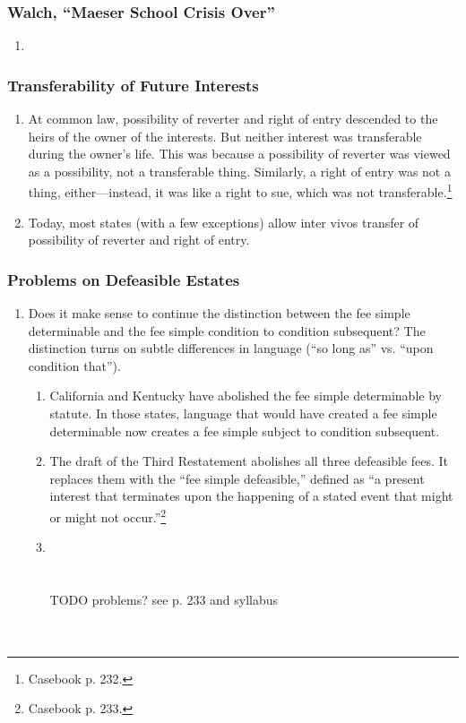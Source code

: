 \subsubsection{Walch, ``Maeser School Crisis Over''}

\begin{enumerate}
    \item %
\end{enumerate}


\subsubsection{Transferability of Future Interests}

\begin{enumerate}
    \item At common law, possibility of reverter and right of entry descended 
    to the heirs of the owner of the interests. But neither interest was 
    transferable during the owner's life. This was because a possibility of 
    reverter was viewed as a possibility, not a transferable thing. Similarly, 
    a right of entry was not a thing, either---instead, it was like a right to 
    sue, which was not transferable.\footnote{Casebook p. 232.}
    \item Today, most states (with a few exceptions) allow inter vivos 
    transfer of possibility of reverter and right of entry.
\end{enumerate}

\subsubsection{Problems on Defeasible Estates}

\begin{enumerate}
    \item Does it make sense to continue the distinction between the fee 
    simple determinable and the fee simple condition to condition subsequent? 
    The distinction turns on subtle differences in language (``so long as'' 
    vs. ``upon condition that'').
    \begin{enumerate}
        \item California and Kentucky have abolished the fee simple 
        determinable by statute. In those states, language that would have 
        created a fee simple determinable now creates a fee simple subject to 
        condition subsequent.
        \item The draft of the Third Restatement abolishes all three 
        defeasible fees. It replaces them with the ``fee simple defeasible,'' 
        defined as ``a present interest that terminates upon the happening of 
        a stated event that might or might not occur.''\footnote{Casebook p. 
        233.}
        \item ~\\\\\\TODO problems? see p. 233 and syllabus\\\\\\
    \end{enumerate}
\end{enumerate}

